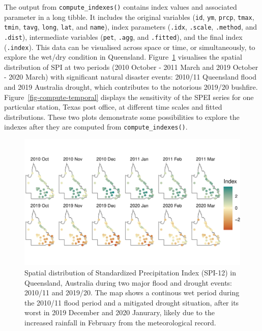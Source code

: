 \documentclass[
]{interact}
\begin{document}
The output from \texttt{compute\_indexes()} contains index values and
associated parameter in a long tibble. It includes the original
variables (\texttt{id}, \texttt{ym}, \texttt{prcp}, \texttt{tmax},
\texttt{tmin}, \texttt{tavg}, \texttt{long}, \texttt{lat}, and
\texttt{name}), index parameters (\texttt{.idx}, \texttt{.scale},
\texttt{.method}, and \texttt{.dist}), intermediate variables
(\texttt{pet}, \texttt{.agg}, and \texttt{.fitted}), and the final index
(\texttt{.index}). This data can be visualised across space or time, or
simultaneously, to explore the wet/dry condition in Queensland.
Figure~\ref{fig-compute-spatial} visualises the spatial distribution of
SPI at two periods (2010 October - 2011 March and 2019 October - 2020
March) with significant natural disaster events: 2010/11 Queensland
flood and 2019 Australia drought, which contributes to the notorious
2019/20 bushfire. Figure~\ref{fig-compute-temporal} displays the
sensitivity of the SPEI series for one particular station, Texas post
office, at different time scales and fitted distributions. These two
plots demonstrate some possibilities to explore the indexes after they
are computed from \texttt{compute\_indexes()}.

\begin{figure}

{\centering \includegraphics{tidyindex_files/figure-pdf/fig-compute-spatial-1.pdf}

}

\caption{\label{fig-compute-spatial}Spatial distribution of Standardized
Precipitation Index (SPI-12) in Queensland, Australia during two major
flood and drought events: 2010/11 and 2019/20. The map shows a continous
wet period during the 2010/11 flood period and a mitigated drought
situation, after its worst in 2019 December and 2020 Janurary, likely
due to the increased rainfall in February from the meteorological
record.}

\end{figure}
\end{document}
